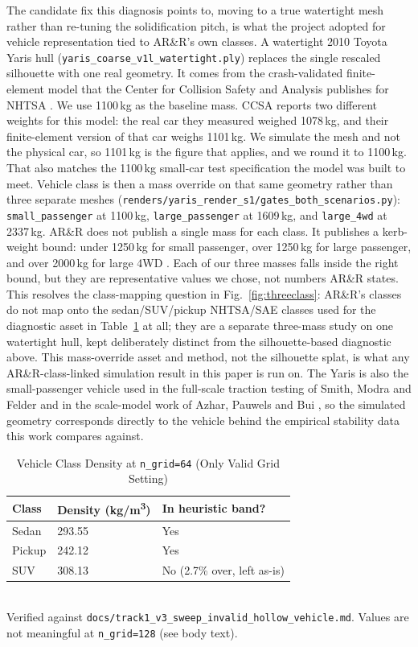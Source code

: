 \documentclass[conference]{IEEEtran}
\begin{document}
The candidate fix this diagnosis points to, moving to a true watertight mesh rather than re-tuning the solidification pitch, is what the project adopted for vehicle representation tied to AR\&R's own classes. A watertight 2010 Toyota Yaris hull (\texttt{yaris\_coarse\_v1l\_watertight.ply}) replaces the single rescaled silhouette with one real geometry. It comes from the crash-validated finite-element model that the Center for Collision Safety and Analysis publishes for NHTSA \cite{ccsa2016yaris}. We use 1100\,kg as the baseline mass. CCSA reports two different weights for this model: the real car they measured weighed 1078\,kg, and their finite-element version of that car weighs 1101\,kg. We simulate the mesh and not the physical car, so 1101\,kg is the figure that applies, and we round it to 1100\,kg. That also matches the 1100\,kg small-car test specification the model was built to meet. Vehicle class is then a mass override on that same geometry rather than three separate meshes (\texttt{renders/\allowbreak yaris\_render\_s1/\allowbreak gates\_both\_\allowbreak scenarios.py}): \texttt{small\_passenger} at 1100\,kg, \texttt{large\_passenger} at 1609\,kg, and \texttt{large\_4wd} at 2337\,kg. AR\&R does not publish a single mass for each class. It publishes a kerb-weight bound: under 1250\,kg for small passenger, over 1250\,kg for large passenger, and over 2000\,kg for large 4WD \cite{shand2011arr}. Each of our three masses falls inside the right bound, but they are representative values we chose, not numbers AR\&R states. This resolves the class-mapping question in Fig.~\ref{fig:threeclass}: AR\&R's classes do not map onto the sedan/SUV/pickup NHTSA/SAE classes used for the diagnostic asset in Table~\ref{tab:vehicle} at all; they are a separate three-mass study on one watertight hull, kept deliberately distinct from the silhouette-based diagnostic above. This mass-override asset and method, not the silhouette splat, is what any AR\&R-class-linked simulation result in this paper is run on. The Yaris is also the small-passenger vehicle used in the full-scale traction testing of Smith, Modra and Felder \cite{smithmodrafelder2019} and in the scale-model work of Azhar, Pauwels and Bui \cite{azhar2023}, so the simulated geometry corresponds directly to the vehicle behind the empirical stability data this work compares against.

\begin{table}[t]
\caption{Vehicle Class Density at \texttt{n\_grid=64} (Only Valid Grid Setting)}
\label{tab:vehicle}
\centering
\begin{tabular}{@{}p{0.7in}p{0.95in}p{1.1in}@{}}
\toprule
\textbf{Class} & \textbf{Density (kg/m\textsuperscript{3})} & \textbf{In heuristic band?} \\
\midrule
Sedan & 293.55 & Yes \\
Pickup & 242.12 & Yes \\
SUV & 308.13 & No (2.7\% over, left as-is) \\
\bottomrule
\end{tabular}
\\[2pt]
{\footnotesize Verified against \texttt{docs/track1\_v3\_sweep\_invalid\_hollow\_vehicle.md}. Values are not meaningful at \texttt{n\_grid=128} (see body text).}
\end{table}
\end{document}
